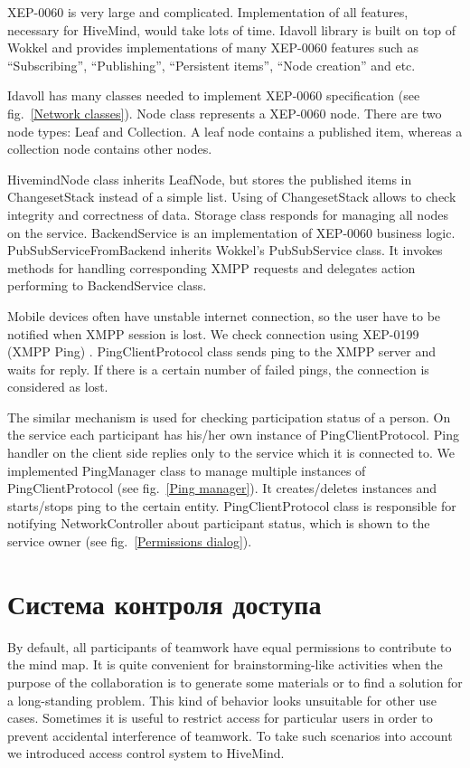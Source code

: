 XEP-0060 is very large and complicated. Implementation of all features,
necessary for HiveMind, would take lots of time. Idavoll library is built on top
of Wokkel and provides implementations of many XEP-0060 features such as
``Subscribing'', ``Publishing'', ``Persistent items'', ``Node creation'' and
etc.

Idavoll has many classes needed to implement XEP-0060 specification (see
fig.~\ref{Network classes}). Node class represents a XEP-0060 node. There are
two node types: Leaf and Collection. A leaf node contains a published item,
whereas a collection node contains other nodes.

HivemindNode class inherits LeafNode, but stores the published items in
ChangesetStack instead of a simple list. Using of ChangesetStack allows to check
integrity and correctness of data. Storage class responds for managing all nodes
on the service. BackendService is an implementation of XEP-0060 business logic.
PubSubServiceFromBackend inherits Wokkel's PubSubService class. It invokes
methods for handling corresponding XMPP requests and delegates action performing
to BackendService class.

Mobile devices often have unstable internet connection, so the user have to be
notified when XMPP session is lost. We check connection using XEP-0199 (XMPP
Ping) \cite{ping-xep-0199}. PingClientProtocol class sends ping to the XMPP
server and waits for reply. If there is a certain number of failed pings, the
connection is considered as lost.

The similar mechanism is used for checking participation status of a person. On
the service each participant has his/her own instance of PingClientProtocol. Ping
handler on the client side replies only to the service which it is connected
to. We implemented PingManager class to manage multiple instances of
PingClientProtocol (see fig.~\ref{Ping manager}).  It creates/deletes instances
and starts/stops ping to the certain entity. PingClientProtocol class is
responsible for notifying NetworkController about participant status, which is
shown to the service owner (see fig.~\ref{Permissions dialog}).


\section{Система контроля доступа}

By default, all participants of teamwork have equal permissions to contribute to
the mind map. It is quite convenient for brainstorming-like activities when the
purpose of the collaboration is to generate some materials or to find a solution
for a long-standing problem. This kind of behavior looks unsuitable for other
use cases. Sometimes it is useful to restrict access for particular users in
order to prevent accidental interference of teamwork. To take such scenarios
into account we introduced access control system to HiveMind.

